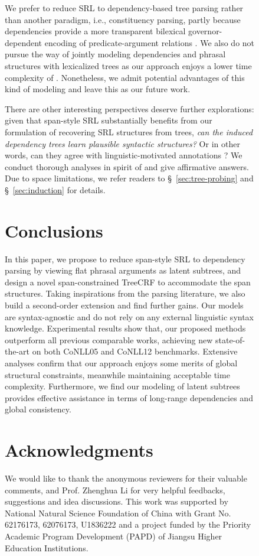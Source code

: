 \documentclass[11pt]{article}
\begin{document}
\begin{figure}[tb!]
We prefer to reduce SRL to dependency-based tree parsing rather than another paradigm, i.e., constituency parsing, partly because dependencies provide a more transparent bilexical governor-dependent encoding of predicate-argument relations \cite{hacioglu-2004-semantic}.
We also do not pursue the way of jointly modeling dependencies and phrasal structures with lexicalized trees \cite{eisner-satta-1999-efficient,yang-tu-2022-combining,lou-etal-2022-nested} as our approach enjoys a lower time complexity of .
Nonetheless, we admit potential advantages of this kind of modeling \cite{liu-etal-2022-structured} and leave this as our future work.

There are other interesting perspectives deserve further explorations: given that span-style SRL substantially benefits from our formulation of recovering SRL structures from trees, \emph{can the induced dependency trees learn plausible syntactic structures?} Or in other words, can they agree with linguistic-motivated annotations \cite{marcus-etal-1993-building}?
We conduct thorough analyses in spirit of \citet{gormley-etal-2014-low,li-etal-2021-syntax} and give affirmative answers.
Due to space limitations, we refer readers to \S~\ref{sec:tree-probing} and \S~\ref{sec:induction} for details.


\section{Conclusions}\label{sec:conclusions}

In this paper, we propose to reduce span-style SRL to dependency parsing by viewing flat phrasal arguments as latent subtrees, and design a novel span-constrained TreeCRF to accommodate the span structures.
Taking inspirations from the parsing literature, we also build a second-order extension and find further gains.
Our models are syntax-agnostic and do not rely on any external linguistic syntax knowledge.
Experimental results show that, our proposed methods outperform all previous comparable works, achieving new state-of-the-art on both CoNLL05 and CoNLL12 benchmarks.
Extensive analyses confirm that our approach enjoys some merits of global structural constraints, meanwhile maintaining acceptable time complexity.
Furthermore, we find our modeling of latent subtrees provides effective assistance in terms of long-range dependencies and global consistency.


\section{Acknowledgments}\label{sec:ack}
We would like to thank the anonymous reviewers for their valuable comments, and Prof. Zhenghua Li for very helpful feedbacks, suggestions and idea discussions.
This work was supported by National Natural Science Foundation of China with Grant No. 62176173, 62076173, U1836222 and a project funded by the Priority Academic Program Development (PAPD) of Jiangsu Higher Education Institutions.


\end{figure}
\end{document}
